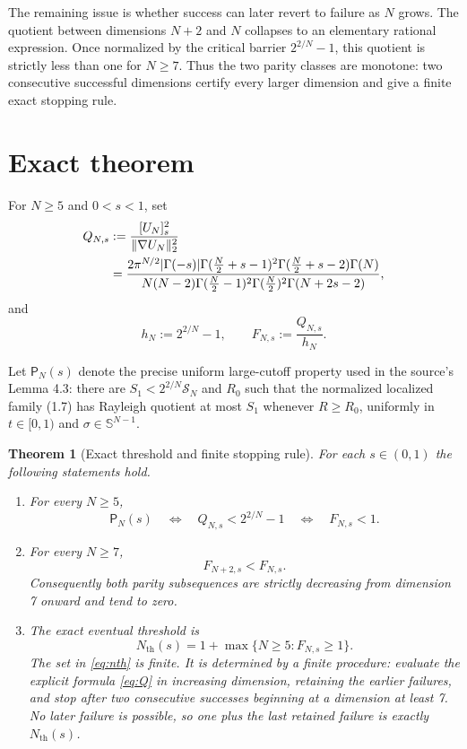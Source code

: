 \documentclass[11pt]{article}
\newtheorem{theorem}{Theorem}
\newcommand{\SN}{\mathcal{S}_N}
\begin{document}
The remaining issue is whether success can later revert to failure as $N$
grows. The quotient between dimensions $N+2$ and $N$ collapses to an
elementary rational expression. Once normalized by the critical barrier
$2^{2/N}-1$, this quotient is strictly less than one for $N\geq7$. Thus the
two parity classes are monotone: two consecutive successful dimensions certify
every larger dimension and give a finite exact stopping rule.

\section{Exact theorem}

For $N\geq5$ and $0<s<1$, set
\begin{align}
 Q_{N,s}
 &:=\frac{[U_N]_s^2}{\|\nabla U_N\|_2^2} \notag\\
 &=\frac{
 2\pi^{N/2}|\Gamma(-s)|
 \Gamma(\frac N2+s-1)^2
 \Gamma(\frac N2+s-2)\Gamma(N)}{
 N(N-2)\Gamma(\frac N2-1)^2\Gamma(\frac N2)^2
 \Gamma(N+2s-2)},                                      \label{eq:Q}
\end{align}
and
\[
 h_N:=2^{2/N}-1,\qquad F_{N,s}:=\frac{Q_{N,s}}{h_N}.
\]

Let $\mathsf P_N(s)$ denote the precise uniform large-cutoff property used in
the source's Lemma 4.3: there are $S_1<2^{2/N}\SN$ and $R_0$ such that the
normalized localized family (1.7) has Rayleigh quotient at most $S_1$ whenever
$R\geq R_0$, uniformly in $t\in[0,1)$ and $\sigma\in\mathbb S^{N-1}$.

\begin{theorem}[Exact threshold and finite stopping rule]\label{thm:main}
For each $s\in(0,1)$ the following statements hold.
\begin{enumerate}
\item For every $N\geq5$,
\[
 \mathsf P_N(s)\quad\Longleftrightarrow\quad
 Q_{N,s}<2^{2/N}-1
 \quad\Longleftrightarrow\quad F_{N,s}<1.
\]
\item For every $N\geq7$,
\[
 F_{N+2,s}<F_{N,s}.
\]
Consequently both parity subsequences are strictly decreasing from dimension
7 onward and tend to zero.
\item The exact eventual threshold is
\[
 N_{\mathrm{th}}(s)
 =1+\max\{N\geq5:F_{N,s}\geq1\}.                       \label{eq:nth}
\]
The set in \eqref{eq:nth} is finite. It is determined by a finite procedure:
evaluate the explicit formula \eqref{eq:Q} in increasing dimension, retaining
the earlier failures, and stop after two consecutive successes beginning at
a dimension at least 7. No later failure is possible, so one plus the last
retained failure is exactly $N_{\mathrm{th}}(s)$.
\end{enumerate}
\end{theorem}
\end{document}
